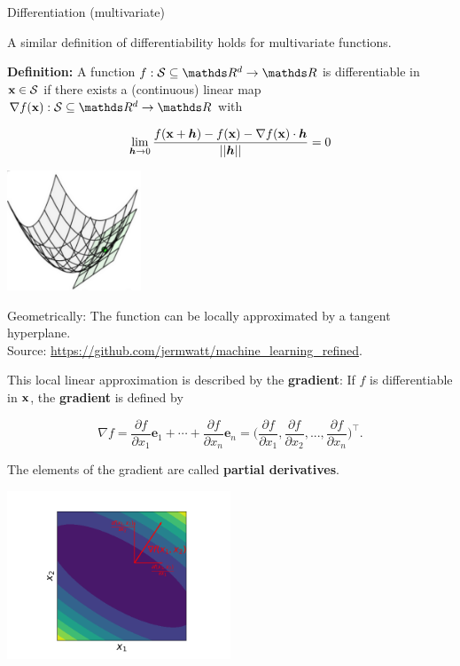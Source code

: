 \begin{vbframe}{Differentiation (multivariate)}

A similar definition of differentiability holds for multivariate functions. 

\lz 

\textbf{Definition: } A function $f: \mathcal{S}\subseteq \R^d \to \R$ is differentiable in $\mathbf{x} \in \mathcal{S}$ if there exists a (continuous) linear map $\nabla f(\xv): \mathcal{S}\subseteq \R^d \to \R$ with %

$$
\lim_{\bm{h} \to 0} \frac{f(\mathbf{x} + \bm{h}) - f(\mathbf{x}) - \nabla f(\mathbf{x}) \cdot \bm{h}}{||\bm{h}||} = 0
$$

\begin{center}
\includegraphics[width = 0.3\textwidth]{figure_man/differentiability_multivariate.png} \\
\begin{footnotesize}
Geometrically: The function can be locally approximated by a tangent hyperplane. \\
Source: \url{https://github.com/jermwatt/machine_learning_refined}.
\end{footnotesize}
\end{center}

\framebreak 


This local linear approximation is described by the \textbf{gradient}: If $f$ is differentiable in $\mathbf{x}$, the \textbf{gradient} is defined by

\vspace*{-0.3cm}

$$
\nabla f = \frac{\partial f}{\partial x_1} \bm e_1 + \cdots + \frac{\partial f}{\partial x_n} \bm e_n =
  \biggl(\frac{\partial f}{\partial x_1}, \frac{\partial f}{\partial x_2}, ..., \frac{\partial f}{\partial x_n}\biggr)^{\top}.
$$

The elements of the gradient are called \textbf{partial derivatives}. 

\begin{center}
	\includegraphics[width = 0.5\textwidth]{figure_man/grad_unit_vectors.png} \\
\end{center}



\end{vbframe}
